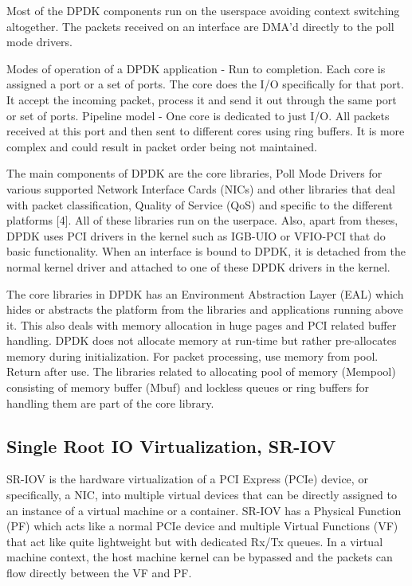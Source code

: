 \documentclass[english, 12pt, a4paper, elec, utf8, a-1b, online]{aaltothesis}
\begin{document}
Most of the DPDK components run on the userspace avoiding context switching altogether. The packets received on an interface are DMA'd directly to the poll mode drivers. 

Modes of operation of a DPDK application - Run to completion. Each core is assigned a port or a set of ports. The core does the I/O specifically for that port. It accept the incoming packet, process it and send it out through the same port or set of ports. Pipeline model - One core is dedicated to just I/O. All packets received at this port and then sent to different cores using ring buffers. It is more complex and could result in packet order being not maintained.


The main components of DPDK are the core libraries, Poll Mode Drivers for various supported Network Interface Cards (NICs) and other libraries that deal with packet classification, Quality of Service (QoS) and specific to the different platforms [4]. All of these libraries run on the userpace. Also, apart from theses, DPDK uses PCI drivers in the kernel such as IGB-UIO or VFIO-PCI that do basic functionality. When an interface is bound to DPDK, it is detached from the normal kernel driver and attached to one of these DPDK drivers in the kernel.


The core libraries in DPDK has an Environment Abstraction Layer (EAL) which hides or abstracts the platform from the libraries and applications running above it. This also deals with memory allocation in huge pages and PCI related buffer handling. DPDK does not allocate memory at run-time but rather pre-allocates memory during initialization. For packet processing, use memory from pool. Return after use. The libraries related to allocating pool of memory (Mempool) consisting of memory buffer (Mbuf) and lockless queues or ring buffers for handling them are part of the core library.

\subsection{Single Root IO Virtualization, SR-IOV}
SR-IOV is the hardware virtualization of a PCI Express (PCIe) device, or specifically, a NIC, into multiple virtual devices that can be directly assigned to an instance of a virtual machine or a container. SR-IOV has a Physical Function (PF) which acts like a normal PCIe device and multiple Virtual Functions (VF) that act like quite lightweight but with dedicated Rx/Tx queues. In a virtual machine context, the host machine kernel can be bypassed and the packets can flow directly between the VF and PF.
\end{document}
